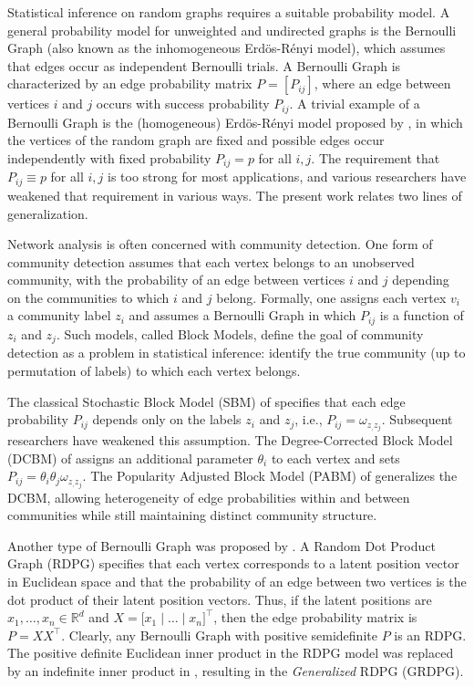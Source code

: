 \documentclass[12pt]{article}
\begin{document}
Statistical inference on random graphs requires a suitable probability
model.  A general probability model for unweighted and undirected
graphs is the Bernoulli Graph (also known as the inhomogeneous
Erd\"{o}s-R\'{e}nyi model), which assumes that edges occur as
independent Bernoulli trials.  A Bernoulli Graph is characterized by
an edge probability matrix $P=[P_{ij}]$, where an edge between
vertices $i$ and $j$ occurs with success probability $P_{ij}$.  A
trivial example of a Bernoulli Graph is the (homogeneous)
Erd\"{o}s-R\'{e}nyi model proposed by \citet{Gilbert:1959}, in which
the vertices of the random graph are fixed and possible edges occur
independently with fixed probability $P_{ij} = p$ for all $i,j$.  The requirement that
$P_{ij} \equiv p$ for all $i,j$ is too strong for most applications, and various
researchers have weakened that requirement in various ways.  The
present work relates two lines of generalization.

Network analysis is often concerned with community detection.  One form of community detection assumes that each vertex belongs to an unobserved community, with the probability of an edge between vertices $i$ and $j$ depending on the communities to which $i$ and $j$ belong.  Formally, one assigns each vertex $v_i$ a community label $z_i$ and assumes a Bernoulli Graph in which $P_{ij}$ is a function of $z_i$ and $z_j$.  Such models, called Block Models, define the goal of community detection as a problem in statistical inference: identify the true community (up to permutation of labels) to which each vertex belongs.

The classical Stochastic Block Model (SBM) of \citet{doi:10.1080/0022250X.1971.9989788} specifies that each edge probability $P_{ij}$ depends only on the labels $z_i$ and $z_j$, i.e., $P_{ij} = \omega_{z_,z_j}$.  Subsequent researchers have weakened this assumption.   The Degree-Corrected Block Model (DCBM) of \citet{Karrer_2011} assigns an additional parameter $\theta_i$ to each vertex and sets $P_{ij} = \theta_i \theta_j \omega_{z_,z_j}$. The Popularity Adjusted Block Model (PABM) of \citet{307cbeb9b1be48299388437423d94bf1} generalizes the DCBM, allowing heterogeneity of edge probabilities within and between communities while still maintaining distinct community structure.

Another type of Bernoulli Graph was proposed by
\citet*{10.1007/978-3-540-77004-6_11}.  A Random Dot Product Graph
(RDPG) specifies that each vertex corresponds to a latent position
vector in Euclidean space and that the probability of an edge between
two vertices is the dot product of their latent position vectors.
Thus, if the latent positions are $x_1,\ldots,x_n \in \mathbb{R}^d$
and $X = \bigl[ x_1 \mid \dots \mid x_n \bigr]^\top$,
then the edge probability matrix is $P = XX^\top$.  Clearly, any
Bernoulli Graph with positive semidefinite $P$ is an RDPG.  The
positive definite Euclidean inner product in the RDPG model was
replaced by an indefinite inner product in
\citet{rubindelanchy2017statistical}, resulting in the {\em
Generalized}\/ RDPG (GRDPG).
\end{document}
